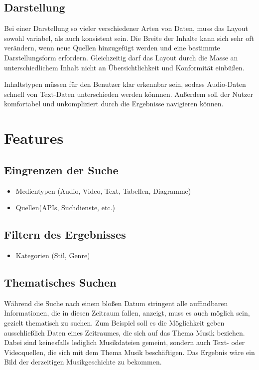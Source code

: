 \subsection{Darstellung}
Bei einer Darstellung so vieler verschiedener Arten von Daten, muss das Layout sowohl variabel, als auch konsistent sein. Die Breite der Inhalte kann sich sehr oft verändern, wenn neue Quellen hinzugefügt werden und eine bestimmte Darstellungsform erfordern. Gleichzeitig darf das Layout durch die Masse an unterschiedlichem Inhalt nicht an Übersichtlichkeit und Konformität einbüßen.

Inhaltstypen müssen für den Benutzer klar erkennbar sein, sodass Audio-Daten schnell von Text-Daten \oae unterschieden werden könnnen. Außerdem soll der Nutzer komfortabel und unkompliziert durch die Ergebnisse navigieren können.


\section{Features}
\subsection{Eingrenzen der Suche}
\begin{itemize}
	\item Medientypen (Audio, Video, Text, Tabellen, Diagramme)
	\item Quellen(APIs, Suchdienste, etc.)
\end{itemize}

\subsection{Filtern des Ergebnisses}
\begin{itemize}
	\item Kategorien (Stil, Genre)
\end{itemize}

\subsection{Thematisches Suchen}
Während die Suche nach einem bloßen Datum stringent alle auffindbaren Informationen, die in diesen Zeitraum fallen, anzeigt, muss es auch möglich sein, gezielt thematisch zu suchen. Zum Beispiel soll es die Möglichkeit geben ausschließlich Daten eines Zeitraumes, die sich auf das Thema Musik beziehen. Dabei sind keinesfalls lediglich Musikdateien gemeint, sondern auch \bspw Text- oder Videoquellen, die sich mit dem Thema Musik beschäftigen. Das Ergebnis wäre ein Bild der derzeitigen Musikgeschichte zu bekommen.

